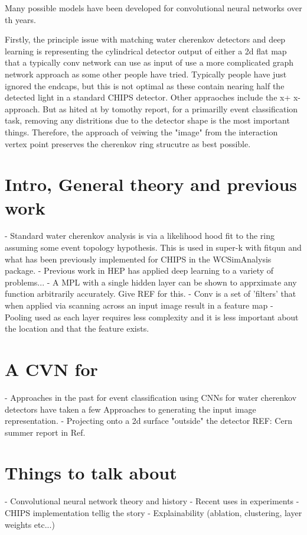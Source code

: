 Many possible models have been developed for convolutional neural networks over th years.

Firstly, the principle issue with matching water cherenkov detectors and deep learning is representing the cylindrical
detector output of either a 2d flat map that a typically conv network can use as input of use a more complicated
graph network approach as some other people have tried. Typically people have just ignored the endcaps, but
this is not optimal as these contain nearing half the detected light in a standard CHIPS detector. Other appraoches
include the x+ x- approach. But as hited at by tomothy report, for a primarilly event classification task,
removing any distritions due to the detector shape is the most important things. Therefore, the approach of
veiwing the "image" from the interaction vertex point preserves the cherenkov ring strucutre as best possible.



\section{Intro, General theory and previous work}
- Standard water cherenkov analysis is via a likelihood hood fit to the ring assuming some event topology hypothesis.
This is used in super-k with fitqun and what has been previously implemented for CHIPS in the WCSimAnalysis package.
- Previous work in HEP has applied deep learning to a variety of problems...
- A MPL with a single hidden layer can be shown to apprximate any function arbitrarily accurately. Give REF for this.
- Conv is a set of 'filters' that when applied via scanning across an input image result in a feature map
- Pooling used as each layer requires less complexity and it is less important about the location and that the feature exists.

\section{A CVN for \chips}

- Approaches in the past for event classification using CNNs for water cherenkov detectors have taken a few Approaches
to generating the input image representation.
- Projecting onto a 2d surface "outside" the detector
REF: Cern summer report in Ref.~\cite{theodore2016}

\section{Things to talk about}
- Convolutional neural network theory and history
- Recent uses in experiments
- CHIPS implementation tellig the story
- Explainability (ablation, clustering, layer weights etc...)

